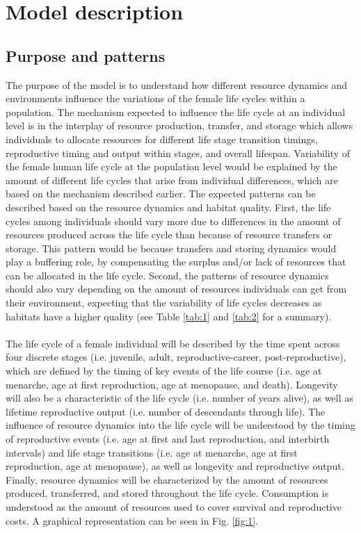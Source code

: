 \documentclass{article}
\begin{document}
\section{Model description}

\subsection{Purpose and patterns}

The purpose of the model is to understand how different resource dynamics and environments influence the variations of the female life cycles within a population. The mechanism expected to influence the life cycle at an individual level is in the interplay of resource production, transfer, and storage which allows individuals to allocate resources for different life stage transition timings, reproductive timing and output within stages, and overall lifespan. Variability of the female human life cycle at the population level would be explained by the amount of different life cycles that arise from individual differences, which are based on the mechanism described earlier. The expected patterns can be described based on the resource dynamics and habitat quality. First, the life cycles among individuals should vary more due to differences in the amount of resources produced across the life cycle than because of resource transfers or storage. This pattern would be because transfers and storing dynamics would play a buffering role, by compensating the surplus and/or lack of resources that can be allocated in the life cycle. Second, the patterns of resource dynamics should also vary depending on the amount of resources individuals can get from their environment, expecting that the variability of life cycles decreases as habitats have a higher quality (see Table \ref{tab:1} and \ref{tab:2} for a summary).
\\\\
The life cycle of a female individual will be described by the time spent across four discrete stages (i.e. juvenile, adult, reproductive-career, post-reproductive), which are defined by the timing of key events of the life course (i.e. age at menarche, age at first reproduction, age at menopause, and death). Longevity will also be a characteristic of the life cycle (i.e. number of years alive), as well as lifetime reproductive output (i.e. number of descendants through life). The influence of resource dynamics into the life cycle will be understood by the timing of reproductive events (i.e. age at first and last reproduction, and interbirth intervals) and life stage transitions (i.e. age at menarche, age at first reproduction, age at menopause), as well as longevity and reproductive output. Finally, resource dynamics will be characterized by the amount of resources produced, transferred, and stored throughout the life cycle. Consumption is understood as the amount of resources used to cover survival and reproductive costs. A graphical representation can be seen in Fig. \ref{fig:1}.
\end{document}
